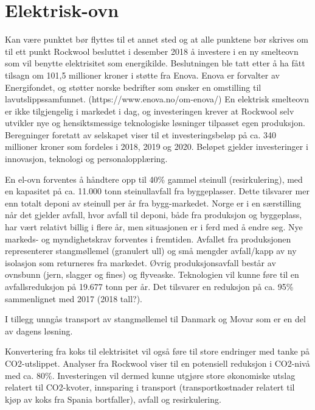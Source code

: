 \section{Elektrisk-ovn}
Kan være punktet bør flyttes til et annet sted og at alle punktene bør skrives om til ett punkt
\indent \newline
Rockwool besluttet i desember 2018 å investere i en ny smelteovn som vil benytte elektrisitet som energikilde. Beslutningen ble tatt etter å ha fått tilsagn om 101,5 millioner kroner i støtte fra Enova. Enova er forvalter av Energifondet, og støtter norske bedrifter som ønsker en omstilling til lavutslippssamfunnet. (https://www.enova.no/om-enova/) En elektrisk smelteovn er ikke tilgjengelig i markedet i dag, og investeringen krever at Rockwool selv utvikler nye og hensiktsmessige teknologiske løsninger tilpasset egen produksjon. Beregninger foretatt av selskapet viser til et investeringsbeløp på ca. 340 millioner kroner som fordeles i 2018, 2019 og 2020. Beløpet gjelder investeringer i innovasjon, teknologi og personalopplæring. 

\indent \newline
En el-ovn forventes å håndtere opp til 40\% gammel steinull (resirkulering), med en kapasitet på ca. 11.000 tonn steinullavfall fra byggeplasser. Dette tilsvarer mer enn totalt deponi av steinull per år fra bygg-markedet. Norge er i en særstilling når det gjelder avfall, hvor avfall til deponi, både fra produksjon og byggeplass, har vært relativt billig i flere år, men situasjonen er i ferd med å endre seg. Nye markeds- og myndighetskrav forventes i fremtiden. Avfallet fra produksjonen representerer stangmøllemel (granulert ull) og små mengder avfall/kapp av ny isolasjon som returneres fra markedet. Øvrig produksjonsavfall består av ovnsbunn (jern, slagger og fines) og flyveaske. Teknologien vil kunne føre til en avfallsreduksjon på 19.677 tonn per år. Det tilsvarer en reduksjon på ca. 95\% sammenlignet med 2017 (2018 tall?). 

\indent \newline
I tillegg unngås transport av stangmøllemel til Danmark og Movar som er en del av dagens løsning.  

\indent \newline
Konvertering fra koks til elektrisitet vil også føre til store endringer med tanke på CO2-utslippet. Analyser fra Rockwool viser til en potensiell reduksjon i CO2-nivå med ca. 80\%. Investeringen vil dermed kunne utgjøre store økonomiske utslag relatert til CO2-kvoter, innsparing i transport (transportkostnader relatert til kjøp av koks fra Spania bortfaller), avfall og resirkulering. 

